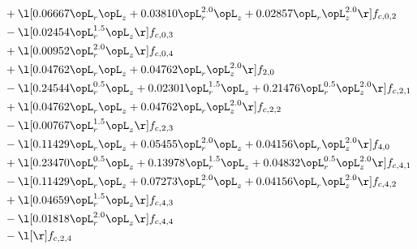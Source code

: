 \begin{alignat}{2}
& + \l[  0.06667 \opL_r \opL_z +  0.03810 \opL_r^{2.0} \opL_z +  0.02857 \opL_r \opL_z^{2.0}  \r] f_{c,0,2} \nonumber \\ 
& - \l[  0.02454 \opL_r^{1.5} \opL_z  \r] f_{c,0,3} \nonumber \\ 
& + \l[  0.00952 \opL_r^{2.0} \opL_z  \r] f_{c,0,4} \nonumber \\ 
& + \l[  0.04762 \opL_r \opL_z +  0.04762 \opL_r \opL_z^{2.0}  \r] f_{2,0} \nonumber \\ 
& - \l[  0.24544 \opL_r^{0.5} \opL_z +  0.02301 \opL_r^{1.5} \opL_z +  0.21476 \opL_r^{0.5} \opL_z^{2.0}  \r] f_{c,2,1} \nonumber \\ 
& + \l[  0.04762 \opL_r \opL_z +  0.04762 \opL_r \opL_z^{2.0}  \r] f_{c,2,2} \nonumber \\ 
& - \l[  0.00767 \opL_r^{1.5} \opL_z  \r] f_{c,2,3} \nonumber \\ 
& - \l[  0.11429 \opL_r \opL_z +  0.05455 \opL_r^{2.0} \opL_z +  0.04156 \opL_r \opL_z^{2.0}  \r] f_{4,0} \nonumber \\ 
& + \l[  0.23470 \opL_r^{0.5} \opL_z +  0.13978 \opL_r^{1.5} \opL_z +  0.04832 \opL_r^{0.5} \opL_z^{2.0}  \r] f_{c,4,1} \nonumber \\ 
& - \l[  0.11429 \opL_r \opL_z +  0.07273 \opL_r^{2.0} \opL_z +  0.04156 \opL_r \opL_z^{2.0}  \r] f_{c,4,2} \nonumber \\ 
& + \l[  0.04659 \opL_r^{1.5} \opL_z  \r] f_{c,4,3} \nonumber \\ 
& - \l[  0.01818 \opL_r^{2.0} \opL_z  \r] f_{c,4,4} \nonumber \\ 
& - \l[  \r] f_{c,2,4} \nonumber \\ 
\end{alignat} 


